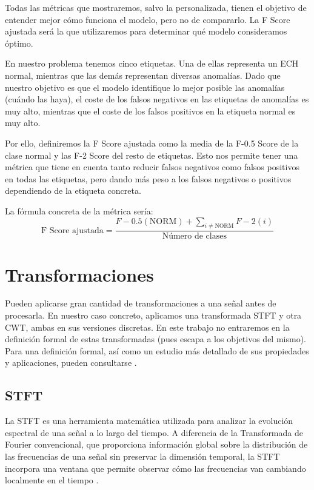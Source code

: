 Todas las métricas que mostraremos, salvo la personalizada, tienen el objetivo de entender mejor cómo funciona el modelo, pero no de compararlo. La F Score ajustada será la que utilizaremos para determinar qué modelo consideramos óptimo.

En nuestro problema tenemos cinco etiquetas. Una de ellas representa un \ac{ECH} normal, mientras que las demás representan diversas anomalías. Dado que nuestro objetivo es que el modelo identifique lo mejor posible las anomalías (cuándo las haya), el coste de los falsos negativos en las etiquetas de anomalías es muy alto, mientras que el coste de los falsos positivos en la etiqueta normal es muy alto.

Por ello, definiremos la F Score ajustada como la media de la F-0.5 Score de la clase normal y las  F-2 Score del resto de etiquetas. Esto nos permite tener una métrica que tiene en cuenta tanto reducir falsos negativos como falsos positivos en todas las etiquetas, pero dando más peso a los falsos negativos o positivos dependiendo de la etiqueta concreta.

La fórmula concreta de la métrica sería:
\begin{equation*}
	\text{F Score ajustada} = \frac{F-0.5(\text{NORM}) + \sum_{i \neq \text{NORM}}F-2(i)}{\text{Número de clases}}
\end{equation*}


\section{Transformaciones}

Pueden aplicarse gran cantidad de transformaciones a una señal antes de procesarla. En nuestro caso concreto, aplicamos una transformada \ac{STFT} y otra \ac{CWT}, ambas en sus versiones discretas. En este trabajo no entraremos en la definición formal de estas transformadas (pues escapa a los objetivos del mismo). Para una definición formal, así como un estudio más detallado de sus propiedades y aplicaciones, pueden consultarse \cite{Oppenheim2009, Allen1977}.

\subsection{\ac{STFT}}

La \ac{STFT} es una herramienta matemática utilizada para analizar la evolución espectral de una señal a lo largo del tiempo. A diferencia de la Transformada de Fourier convencional, que proporciona información global sobre la distribución de las frecuencias de una señal sin preservar la dimensión temporal, la \ac{STFT} incorpora una ventana que permite observar cómo las frecuencias van cambiando localmente en el tiempo \citep{Allen1977, Oppenheim2009}.

